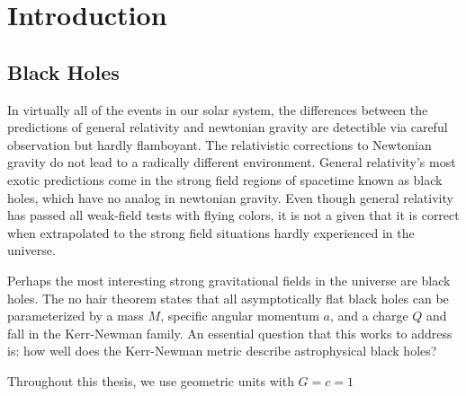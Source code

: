 \chapter{Introduction}
\label{chap:intro}

\begin{refsection}

\section{Black Holes}

In virtually all of the events in our solar system, the differences between the predictions of general relativity and newtonian gravity are detectible via careful observation but hardly flamboyant. The relativistic corrections to Newtonian gravity do not lead to a radically different environment. General relativity's most exotic predictions come in the strong field regions of spacetime known as black holes, which have no analog in newtonian gravity. Even though general relativity has passed all weak-field tests with flying colors, it is not a given that it is correct when extrapolated to the strong field situations hardly experienced in the universe.

Perhaps the most interesting strong gravitational fields in the universe are black holes. The no hair theorem states that all asymptotically flat black holes can be parameterized by a mass $M$, specific angular momentum $a$, and a charge $Q$ and fall in the Kerr-Newman family.
An essential question that this works to address is:  how well does the Kerr-Newman metric describe astrophysical black holes?

Throughout this thesis, we use geometric units with $G=c=1$













\printbibliography[heading=subbibliography]
\end{refsection}